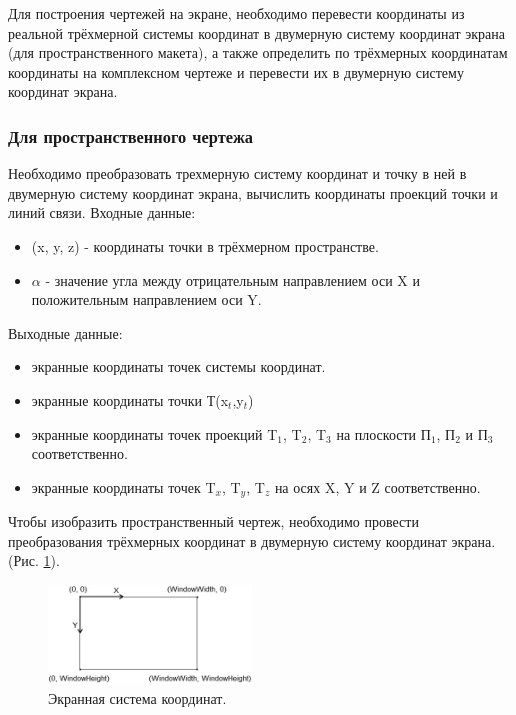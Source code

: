 \documentclass[13pt]{extarticle}
\begin{document}
Для построения чертежей на экране, необходимо перевести координаты из реальной трёхмерной системы координат в двумерную систему координат экрана (для пространственного макета), а также определить по трёхмерных координатам координаты на комплексном чертеже и перевести их в двумерную систему координат экрана.

\subsubsection{Для пространственного чертежа}
Необходимо преобразовать трехмерную систему координат и точку в ней в двумерную систему координат экрана, вычислить координаты проекций точки и линий связи.
Входные данные:	
 	\begin{itemize}
 		\item (x, y, z) - координаты точки в трёхмерном пространстве.
 		\item $\alpha$ - значение угла между отрицательным направлением оси X и положительным направлением оси Y.
 	\end{itemize}
 Выходные данные:	
 	\begin{itemize}
 		\item экранные координаты точек системы координат.
 		\item экранные координаты точки Т(x$_t$,y$_t$)
 		\item экранные координаты точек проекций T$_1$, T$_2$, T$_3$ на плоскости П$_1$, П$_2$ и П$_3$ соответственно.
 		\item экранные координаты точек T$_x$, T$_y$, T$_z$ на осях X, Y и Z соответственно.
 	\end{itemize}
Чтобы изобразить пространственный чертеж, необходимо провести преобразования трёхмерных координат в двумерную систему координат экрана.  (Рис. \ref{fig:screenCoordSys}). \hspace*{\fill}
	\begin{figure} 
		\includegraphics[width=0.48\textwidth]{Images/screenCoordinateSystem}
		\caption{Экранная система координат.}
		\label{fig:screenCoordSys}
	
	\end{figure}
	
\end{document}
